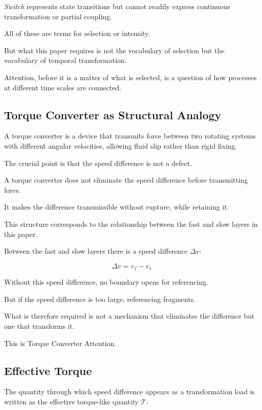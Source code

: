 \emph{Switch} represents state transitions but cannot readily express continuous transformation or partial coupling.

All of these are terms for selection or intensity.

But what this paper requires is not the vocabulary of selection but the vocabulary of temporal transformation.

Attention, before it is a matter of what is selected, is a question of how processes at different time scales are connected.

\subsection{Torque Converter as Structural Analogy}


A torque converter is a device that transmits force between two rotating systems with different angular velocities, allowing fluid slip rather than rigid fixing.

The crucial point is that the speed difference is not a defect.

A torque converter does not eliminate the speed difference before transmitting force.

It makes the difference transmissible without rupture, while retaining it.

This structure corresponds to the relationship between the fast and slow layers in this paper.

Between the fast and slow layers there is a speed difference $\Delta v$:

\begin{equation}
\Delta v = v_f - v_s
\end{equation}

Without this speed difference, no boundary opens for referencing.

But if the speed difference is too large, referencing fragments.

What is therefore required is not a mechanism that eliminates the difference but one that transforms it.

This is Torque Converter Attention.

\subsection{Effective Torque}


The quantity through which speed difference appears as a transformation load is written as the effective torque-like quantity $\mathcal{T}$:

